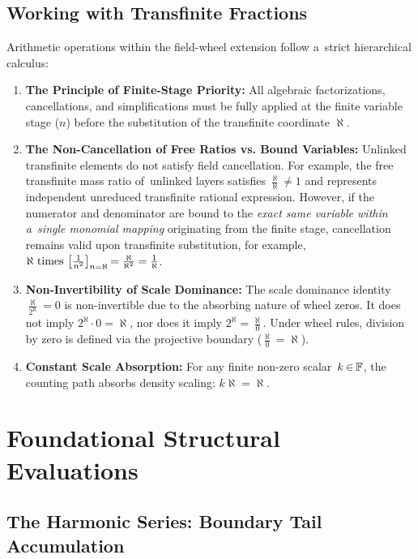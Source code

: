 \documentclass[11pt,a4paper]{article}
\newcommand\nfex{\hspace{-0.2ex}} %
\newcommand\cin{\nfex\in\nfex}
\theoremstyle{definition}
\theoremstyle{noperiod}
\begin{document}
\subsection{Working with Transfinite Fractions}

Arithmetic operations within the field-wheel extension follow a~strict hierarchical calculus:
\begin{enumerate}
\item \textbf{The Principle of Finite-Stage Priority:} All algebraic factorizations, cancellations, and simplifications must be fully applied at the finite variable stage ($n$) before the substitution of the transfinite coordinate $\aleph$.
\item \textbf{The Non-Cancellation of Free Ratios vs. Bound Variables:} Unlinked transfinite elements do not satisfy field cancellation. For example, the free transfinite mass ratio of~unlinked layers satisfies $\frac{\aleph}{\aleph} \neq 1$ and represents independent unreduced transfinite rational expression. However, if the numerator and denominator are bound to the \textit{exact same variable within a~single monomial mapping} originating from the finite stage, cancellation remains valid upon transfinite substitution, for example, $\aleph \text{ times } \bigl[ \frac{1}{n^2} \bigr]_{n=\aleph} \nfex = \frac{\aleph}{\aleph^2} = \frac{1}{\aleph}$.
\item \textbf{Non-Invertibility of Scale Dominance:} The scale dominance identity $\frac{\aleph}{2^\aleph} = 0$ is non-invertible due to the absorbing nature of wheel zeros. It does not imply $2^\aleph \cdot 0 = \aleph$, nor does it imply $2^\aleph = \frac{\aleph}{0}$. Under wheel rules, division by zero is defined via the projective boundary ($\frac{\aleph}{0} = \aleph$).
\item \textbf{Constant Scale Absorption:} For any finite non-zero scalar~${k \cin \mathbb{F}}$, the counting path absorbs density scaling: $k\aleph = \aleph$.
\end{enumerate}

\section{Foundational Structural Evaluations}

\subsection{The Harmonic Series: Boundary Tail Accumulation}
\end{document}
